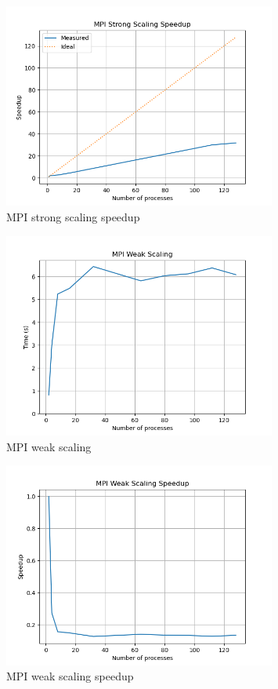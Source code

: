 \begin{figure}[h!]
    \centering
    \includegraphics[width=0.8\textwidth]{../images/mpi_strong_scaling_speedup.png}
    \caption{MPI strong scaling speedup}
    \label{fig:mpi_strong_scaling_speedup}
\end{figure}


\begin{figure}[!h]
    \centering
    \includegraphics[width=0.8\textwidth]{../images/mpi_weak_scaling.png}
    \caption{MPI weak scaling}
    \label{fig:mpi_weak_scaling}
\end{figure}

\begin{figure}[h!]
    \centering
    \includegraphics[width=0.8\textwidth]{../images/mpi_weak_scaling_speedup.png}
    \caption{MPI weak scaling speedup}
    \label{fig:mpi_weak_scaling_speedup}
\end{figure}


